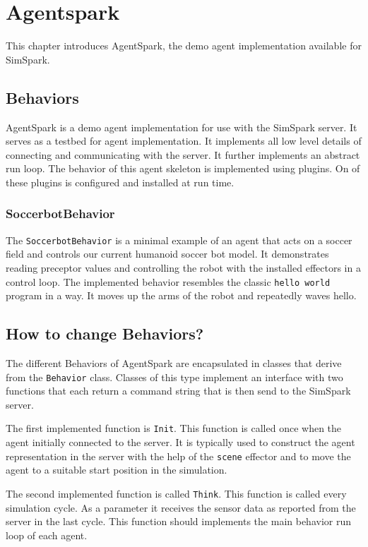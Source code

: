 \chapter{Agentspark}
\label{cha:agentspark}

This chapter introduces AgentSpark, the demo agent implementation
available for SimSpark.

\section{Behaviors}

AgentSpark is a demo agent implementation for use with the SimSpark
server. It serves as a testbed for agent implementation. It implements
all low level details of connecting and communicating with the
server. It further implements an abstract run loop. The behavior of
this agent skeleton is implemented using plugins. On of these plugins
is configured and installed at run time.

\subsection{SoccerbotBehavior}

The \texttt{SoccerbotBehavior} is a minimal example of an agent that
acts on a soccer field and controls our current humanoid soccer bot
model. It demonstrates reading preceptor values and controlling the
robot with the installed effectors in a control loop. The implemented
behavior resembles the classic \texttt{hello world} program in a
way. It moves up the arms of the robot and repeatedly waves hello.

\section{How to change Behaviors?}

The different Behaviors of AgentSpark are encapsulated in classes
that derive from the \texttt{Behavior} class. Classes of this type
implement an interface with two functions that each return a command
string that is then send to the SimSpark server.

The first implemented function is \texttt{Init}. This function is
called once when the agent initially connected to the server. It is
typically used to construct the agent representation in the server
with the help of the \texttt{scene} effector and to move the agent to
a suitable start position in the simulation.

The second implemented function is called \texttt{Think}. This
function is called every simulation cycle. As a parameter it receives
the sensor data as reported from the server in the last cycle. This
function should implements the main behavior run loop of each
agent.

